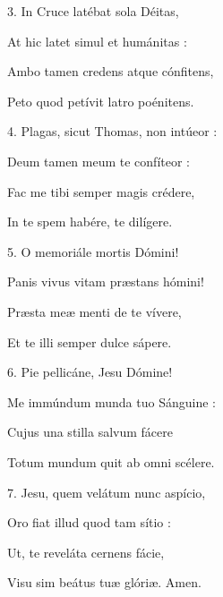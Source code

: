 \item 3. In Cruce latébat sola Déitas,

\item At hic latet simul et humánitas : 

\item Ambo tamen credens atque cónfitens,

\item Peto quod petívit latro poénitens.

\item 4. Plagas, sicut Thomas, non intúeor :

\item Deum tamen meum te confíteor :

\item Fac me tibi semper magis crédere,

\item In te spem habére, te dilígere.

\item 5. O memoriále mortis Dómini!

\item Panis vivus vitam præstans hómini!

\item Præsta meæ menti de te vívere,

\item Et te illi semper dulce sápere.

\item 6. Pie pellicáne, Jesu Dómine!

\item Me immúndum munda tuo Sánguine :

\item Cujus una stilla salvum fácere

\item Totum mundum quit ab omni scélere.


\item 7. Jesu, quem velátum nunc aspício,

\item Oro fiat illud quod tam sítio :

\item Ut, te reveláta cernens fácie,

\item Visu sim beátus tuæ glóriæ. Amen.